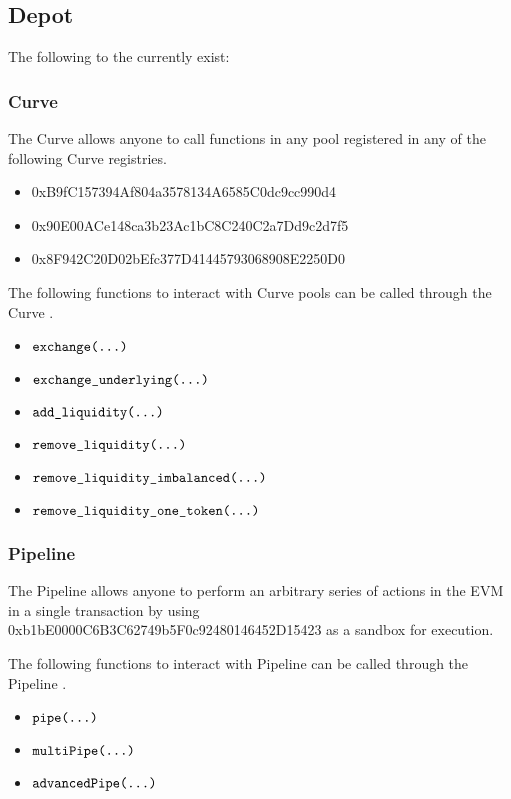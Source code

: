 \documentclass[class=article, crop=false]{standalone}
\begin{document}
\subsection{Depot}
The following  to the  currently exist:

\subsubsection{Curve}
The Curve  allows anyone to call functions in any pool registered in any of the following Curve registries.
\begin{itemize}
    \item 0xB9fC157394Af804a3578134A6585C0dc9cc990d4
    \item 0x90E00ACe148ca3b23Ac1bC8C240C2a7Dd9c2d7f5
    \item 0x8F942C20D02bEfc377D41445793068908E2250D0
\end{itemize}

The following functions to interact with Curve pools can be called through the Curve .
\begin{itemize}
    \item $\texttt{exchange(...)}$
    \item $\texttt{exchange\_underlying(...)}$
    \item $\texttt{add\_liquidity(...)}$
    \item $\texttt{remove\_liquidity(...)}$
    \item $\texttt{remove\_liquidity\_imbalanced(...)}$
    \item $\texttt{remove\_liquidity\_one\_token(...)}$
\end{itemize}

\subsubsection{Pipeline}
The Pipeline  allows anyone to perform an arbitrary series of actions in the EVM in a single transaction by using 0xb1bE0000C6B3C62749b5F0c92480146452D15423 as a sandbox for execution.

The following functions to interact with Pipeline can be called through the Pipeline .
\begin{itemize}
    \item $\texttt{pipe(...)}$
    \item $\texttt{multiPipe(...)}$
    \item $\texttt{advancedPipe(...)}$
\end{itemize}
\end{document}
